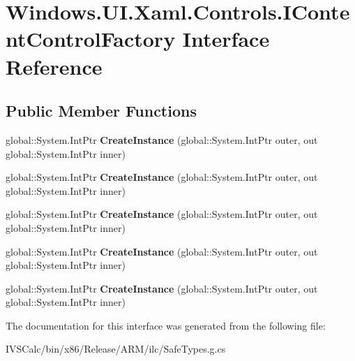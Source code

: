\hypertarget{interface_windows_1_1_u_i_1_1_xaml_1_1_controls_1_1_i_content_control_factory}{}\section{Windows.\+U\+I.\+Xaml.\+Controls.\+I\+Content\+Control\+Factory Interface Reference}
\label{interface_windows_1_1_u_i_1_1_xaml_1_1_controls_1_1_i_content_control_factory}
\subsection*{Public Member Functions}
\begin{DoxyCompactItemize}
\item 
\mbox{\label{interface_windows_1_1_u_i_1_1_xaml_1_1_controls_1_1_i_content_control_factory_a57e2565e3b54ab057193a39c4f27759b}} 
global\+::\+System.\+Int\+Ptr {\bfseries Create\+Instance} (global\+::\+System.\+Int\+Ptr outer, out global\+::\+System.\+Int\+Ptr inner)
\item 
\mbox{\label{interface_windows_1_1_u_i_1_1_xaml_1_1_controls_1_1_i_content_control_factory_a57e2565e3b54ab057193a39c4f27759b}} 
global\+::\+System.\+Int\+Ptr {\bfseries Create\+Instance} (global\+::\+System.\+Int\+Ptr outer, out global\+::\+System.\+Int\+Ptr inner)
\item 
\mbox{\label{interface_windows_1_1_u_i_1_1_xaml_1_1_controls_1_1_i_content_control_factory_a57e2565e3b54ab057193a39c4f27759b}} 
global\+::\+System.\+Int\+Ptr {\bfseries Create\+Instance} (global\+::\+System.\+Int\+Ptr outer, out global\+::\+System.\+Int\+Ptr inner)
\item 
\mbox{\label{interface_windows_1_1_u_i_1_1_xaml_1_1_controls_1_1_i_content_control_factory_a57e2565e3b54ab057193a39c4f27759b}} 
global\+::\+System.\+Int\+Ptr {\bfseries Create\+Instance} (global\+::\+System.\+Int\+Ptr outer, out global\+::\+System.\+Int\+Ptr inner)
\item 
\mbox{\label{interface_windows_1_1_u_i_1_1_xaml_1_1_controls_1_1_i_content_control_factory_a57e2565e3b54ab057193a39c4f27759b}} 
global\+::\+System.\+Int\+Ptr {\bfseries Create\+Instance} (global\+::\+System.\+Int\+Ptr outer, out global\+::\+System.\+Int\+Ptr inner)
\end{DoxyCompactItemize}


The documentation for this interface was generated from the following file\+:\begin{DoxyCompactItemize}
\item 
I\+V\+S\+Calc/bin/x86/\+Release/\+A\+R\+M/ilc/Safe\+Types.\+g.\+cs\end{DoxyCompactItemize}

